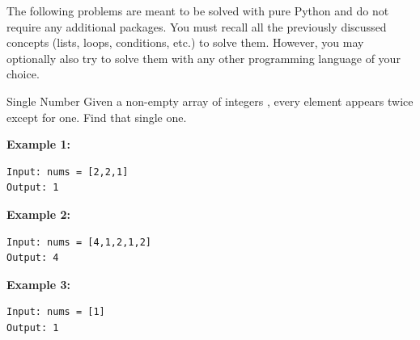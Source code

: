 \documentclass[twoside]{article}
\begin{document}
\maketitle

\vspace{10pt}
The following problems are meant to be solved with pure Python and do not require any additional packages. 
You must recall all the previously discussed concepts (lists, loops, conditions, etc.) to solve them.
However, you may optionally also try to solve them with any other programming language of your choice.

\begin{task}{Single Number}{}{}
Given a non-empty array of integers , every element appears twice except for one. Find that single one.
\vspace{10pt}

\textbf{Example 1:}
\begin{lstlisting}[numbers=none]
Input: nums = [2,2,1]
Output: 1
\end{lstlisting}
\vspace{10pt}

\textbf{Example 2:}
\begin{lstlisting}[numbers=none]
Input: nums = [4,1,2,1,2]
Output: 4
\end{lstlisting}
\vspace{10pt}

\textbf{Example 3:}
\begin{lstlisting}[numbers=none]
Input: nums = [1]
Output: 1
\end{lstlisting}

\end{task}

\clearpage
\end{document}
